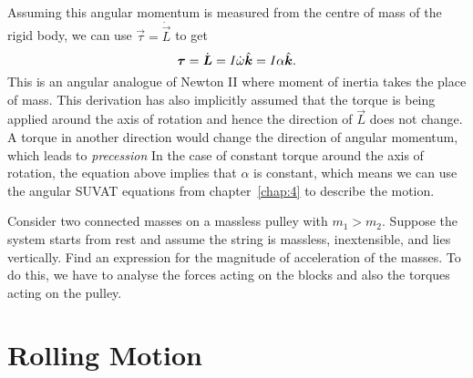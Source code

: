 \documentclass[../classical_mechanics.tex]{subfiles}
\begin{document}
        \paragraph{}
        Assuming this angular momentum is measured from the centre of mass of the rigid body, we can use $\vec{\tau}=\dot{\vec{L}}$ to get
        \begin{equation}
            \boldsymbol{\tau}=\dot{\boldsymbol{L}}=I\dot{\omega}\hat{\boldsymbol{k}}=I\alpha\hat{\boldsymbol{k}}.
        \end{equation}
        This is an angular analogue of Newton II where moment of inertia takes the place of mass.
        This derivation has also implicitly assumed that the torque is being applied around the axis of rotation and hence the direction of $\vec{L}$ does not change.
        A torque in another direction would change the direction of angular momentum, which leads to \textit{precession}
        In the case of constant torque around the axis of rotation, the equation above implies that $\alpha$ is constant, which means we can use the angular SUVAT equations from chapter~\ref{chap:4} to describe the motion. 
        \begin{example}
            Consider two connected masses on a massless pulley with $m_1>m_2$.
            Suppose the system starts from rest and assume the string is massless, inextensible, and lies vertically.
            Find an expression for the magnitude of acceleration of the masses.
            To do this, we have to analyse the forces acting on the blocks and also the torques acting on the pulley.
        \end{example}


    \section{Rolling Motion}
\end{document}
